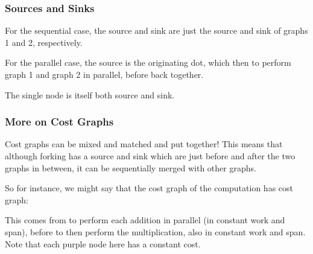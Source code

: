 \documentclass[aspectratio=169, handout]{beamer}
\newcommand{\fhex}[3][]{\node[hex, #1, fill=hexcolor, minimum width=0.4in] (#2) {#3}}
\begin{document}
\begin{frame}[fragile]
  \frametitle{Sources and Sinks}

  For the sequential case, the source and sink are just the source and sink of
  graphs 1 and 2, respectively.

  \pause
  \vspace{\fill}

  For the parallel case, the source is the originating dot, which then
   to perform graph 1 and graph 2 in parallel, before 
  back together.

  \pause
  \vspace{\fill}

  The single node is itself both source and sink.
\end{frame}

\begin{frame}[fragile]
  \frametitle{More on Cost Graphs}

  \begin{center}
  \begin{minipage}{0.5\textwidth}
    \raggedright

  Cost graphs can be mixed and matched and put together! This means that
  although forking has a source and sink which are just before
  and after the two graphs in between, it can be sequentially merged with
  other graphs.

  \vspace{10pt}

    So for instance, we might say that the cost graph of the computation
     has cost graph:
  \end{minipage}
  \begin{minipage}{0.49\textwidth}
    \centering
  \end{minipage}
  \end{center}

  \pause
  \vspace{10pt}

  This comes from  to perform each addition in parallel
  (in constant work and span), before  to then perform
  the multiplication, also in constant work and span. Note that each
  purple node here has a constant cost.
\end{frame}
\end{document}
